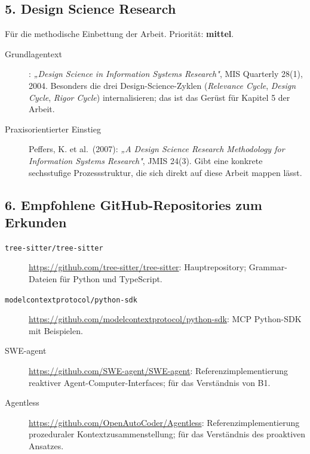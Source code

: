 \subsection*{5. Design Science Research}

Für die methodische Einbettung der Arbeit. Priorität: \textbf{mittel}.

\begin{description}
  \item[Grundlagentext] \textcite{hevner2004dsr}: \emph{„Design Science in Information Systems Research"}, MIS Quarterly 28(1), 2004. Besonders die drei Design-Science-Zyklen (\emph{Relevance Cycle}, \emph{Design Cycle}, \emph{Rigor Cycle}) internalisieren; das ist das Gerüst für Kapitel 5 der Arbeit.

  \item[Praxisorientierter Einstieg] Peffers, K. et al.\ (2007): \emph{„A Design Science Research Methodology for Information Systems Research"}, JMIS 24(3). Gibt eine konkrete sechsstufige Prozessstruktur, die sich direkt auf diese Arbeit mappen lässt.
\end{description}

\subsection*{6. Empfohlene GitHub-Repositories zum Erkunden}

\begin{description}
  \item[\texttt{tree-sitter/tree-sitter}] \url{https://github.com/tree-sitter/tree-sitter}: Hauptrepository; Grammar-Dateien für Python und TypeScript.
  \item[\texttt{modelcontextprotocol/python-sdk}] \url{https://github.com/modelcontextprotocol/python-sdk}: MCP Python-SDK mit Beispielen.
  \item[SWE-agent] \url{https://github.com/SWE-agent/SWE-agent}: Referenzimplementierung reaktiver Agent-Computer-Interfaces; für das Verständnis von B1.
  \item[Agentless] \url{https://github.com/OpenAutoCoder/Agentless}: Referenzimplementierung prozeduraler Kontextzusammenstellung; für das Verständnis des proaktiven Ansatzes.
\end{description}

